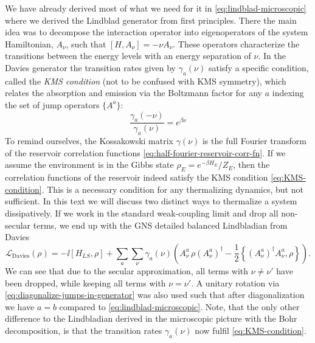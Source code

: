 We have already derived most of what we need for it in \eqref{eq:lindblad-microscopic} where we derived the Lindblad generator from first principles. There the main idea was to decompose the interaction operator into eigenoperators of the system Hamiltonian, $A_\nu$, such that $[H, A_\nu] = -\nu A_\nu$. These operators characterize the transitions between the energy levels with an energy separation of $\nu$. In the Davies generator the transition rates given by $\gamma_a(\nu)$ satisfy a specific condition, called the \textit{KMS condition} (not to be confused with KMS symmetry), which relates the absorption and emission via the Boltzmann factor for any $a$ indexing the set of jump operators $\{A^a\}$:
\begin{equation}
    \label{eq:KMS-condition}
    \frac{\gamma_a(-\nu)}{\gamma_a(\nu)} = e^{\beta \nu}
\end{equation}
To remind ourselves, the Kossakowski matrix $\gamma(\nu)$ is the full Fourier transform of the reservoir correlation functions \eqref{eq:half-fourier-reservoir-corr-fn}. If we assume the environment is in the Gibbs state $\rho_E = e^{-\beta H_E} / Z_E$, then the correlation functions of the reservoir indeed satisfy the KMS condition \eqref{eq:KMS-condition}. This is a necessary condition for any thermalizing dynamics, but not sufficient. In this text we will discuss two distinct ways to thermalize a system dissipatively. If we work in the standard weak-coupling limit and drop all non-secular terms, we end up with the GNS detailed balanced Lindbladian from Davies
\begin{equation}
    \label{eq:davies-generator}
    \mathcal{L}_\text{Davies}(\rho) = -\ii[H_{LS}, \rho] +  \sum_{a}\sum_\nu \gamma_{a}(\nu)\left(A^a_\nu\, \rho (A^a_\nu)^\dagger - \frac{1}{2}\left\{(A^a_\nu)^\dagger A^a_\nu, \rho\right\}\right).
\end{equation}
We can see that due to the secular approximation, all terms with $\nu \neq \nu'$ have been dropped, while keeping all terms with $\nu=\nu'$. A unitary rotation via \eqref{eq:diagonalize-jumps-in-generator} was also used such that after diagonalization we have $a=b$ compared to \eqref{eq:lindblad-microscopic}. Note, that the only other difference to the Lindbladian derived in the microscopic picture with the Bohr decomposition, is that the transition rates $\gamma_{a}(\nu)$ now fulfil \eqref{eq:KMS-condition}. 

